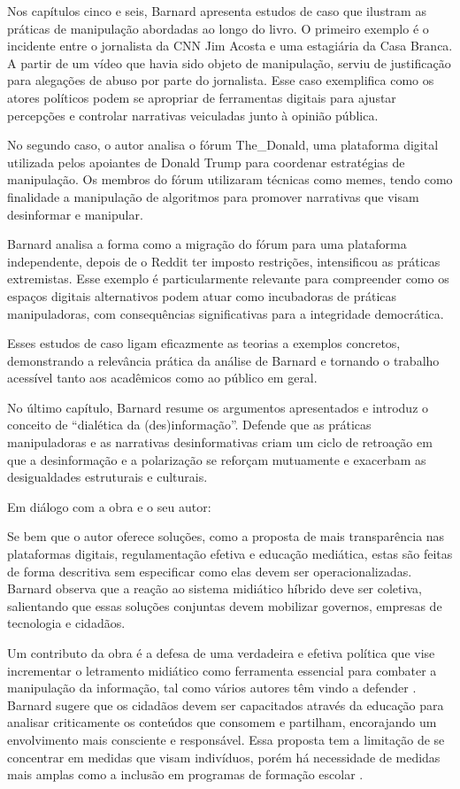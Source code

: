 \documentclass[portuguese]{textolivre}
\begin{document}
Nos capítulos cinco e seis, Barnard apresenta estudos de caso que ilustram as práticas de manipulação abordadas ao longo do livro. O primeiro exemplo é o incidente entre o jornalista da CNN Jim Acosta e uma estagiária da Casa Branca. A partir de um vídeo que havia sido objeto de manipulação, serviu de justificação para alegações de abuso por parte do jornalista. Esse caso exemplifica como os atores políticos podem se apropriar de ferramentas digitais para ajustar percepções e controlar narrativas veiculadas junto à opinião pública.

No segundo caso, o autor analisa o fórum The\_Donald, uma plataforma digital utilizada pelos apoiantes de Donald Trump para coordenar estratégias de manipulação. Os membros do fórum utilizaram técnicas como memes, tendo como finalidade a manipulação de algoritmos para promover narrativas que visam desinformar e manipular.

Barnard analisa a forma como a migração do fórum para uma plataforma independente, depois de o Reddit ter imposto restrições, intensificou as práticas extremistas. Esse exemplo é particularmente relevante para compreender como os espaços digitais alternativos podem atuar como incubadoras de práticas manipuladoras, com consequências significativas para a integridade democrática.

Esses estudos de caso ligam eficazmente as teorias a exemplos concretos, demonstrando a relevância prática da análise de Barnard e tornando o trabalho acessível tanto aos acadêmicos como ao público em geral.

No último capítulo, Barnard resume os argumentos apresentados e introduz o conceito de “dialética da (des)informação”. Defende que as práticas manipuladoras e as narrativas desinformativas criam um ciclo de retroação em que a desinformação e a polarização se reforçam mutuamente e exacerbam as desigualdades estruturais e culturais.

Em diálogo com a obra e o seu autor:

Se bem que o autor oferece soluções, como a proposta de mais transparência nas plataformas digitais, regulamentação efetiva e educação mediática, estas são feitas de forma descritiva sem especificar como elas devem ser operacionalizadas. Barnard observa que a reação ao sistema midiático híbrido deve ser coletiva, salientando que essas soluções conjuntas devem mobilizar governos, empresas de tecnologia e cidadãos.

Um contributo da obra é a defesa de uma verdadeira e efetiva política que vise incrementar o letramento midiático como ferramenta essencial para combater a manipulação da informação, tal como vários autores têm vindo a defender \cite{souza2022a}. Barnard sugere que os cidadãos devem ser capacitados através da educação para analisar criticamente os conteúdos que consomem e partilham, encorajando um envolvimento mais consciente e responsável. Essa proposta tem a limitação de se concentrar em medidas que visam indivíduos, porém há necessidade de medidas mais amplas como a inclusão em programas de formação escolar \cite{souza2023}.
\end{document}
